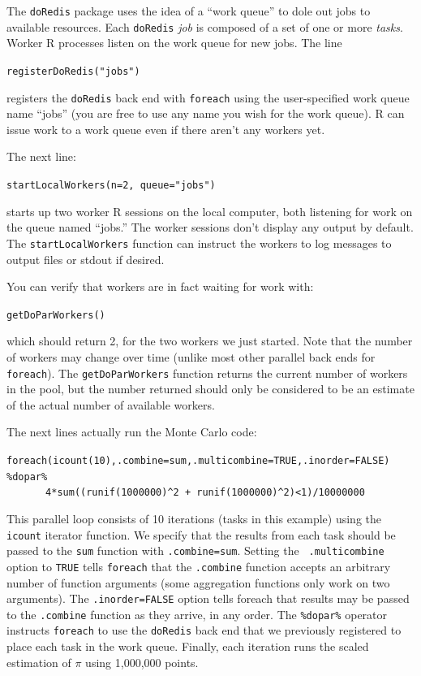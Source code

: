 \documentclass[12pt]{article}
\begin{document}
The {\tt doRedis} package uses the idea of a ``work queue'' to dole out jobs
to available resources. Each {\tt doRedis} \emph{job} is composed of a set
of one or more \emph{tasks}. Worker R processes listen on the work queue
for new jobs. The line

\noindent \verb+registerDoRedis("jobs")+

\noindent registers the {\tt doRedis} back end with {\tt foreach} using the
user-specified work queue name ``jobs'' (you are free to use any name you wish
for the work queue). R can issue work to a work queue even if there aren't
any workers yet.

The next line:

\noindent \verb+startLocalWorkers(n=2, queue="jobs")+

\noindent starts up two worker R sessions on the local computer, both listening
for work on the queue named ``jobs.'' The worker sessions don't display any 
output by default. The {\tt startLocalWorkers} function can instruct the
workers to log messages to output files or stdout if desired.

You can verify that workers are in fact waiting for work with:

\noindent \verb+getDoParWorkers()+

\noindent which should return 2, for the two workers we just started. Note that
the number of workers may change over time (unlike most other parallel back
ends for {\tt foreach}). The {\tt getDoParWorkers} function returns the current
number of workers in the pool, but the number returned should only be
considered to be an estimate of the actual number of available workers.

The next lines actually run the Monte Carlo code:

\noindent \verb+foreach(icount(10),.combine=sum,.multicombine=TRUE,.inorder=FALSE) %dopar%+
\\
$\phantom{xxxxxx}$\verb_4*sum((runif(1000000)^2 + runif(1000000)^2)<1)/10000000_

\noindent
This parallel loop consists of 10 iterations (tasks in this example) using the 
{\tt icount} iterator function.
We specify that the results from each task should be passed to
the {\tt sum} function with {\tt .combine=sum}.  Setting the {\tt
.multicombine} option to {\tt TRUE} tells {\tt foreach} that the {\tt .combine}
function accepts an arbitrary number of function arguments (some aggregation
functions only work on two arguments). The {\tt .inorder=FALSE} option tells
foreach that results may be passed to the {\tt .combine} function as they 
arrive, in any order. The {\tt \%dopar\%} operator instructs
{\tt foreach} to use the {\tt doRedis} back end that we previously registered
to place each task in the work queue.  Finally, each iteration runs the scaled
estimation of $\pi$ using 1,000,000 points.
\end{document}
